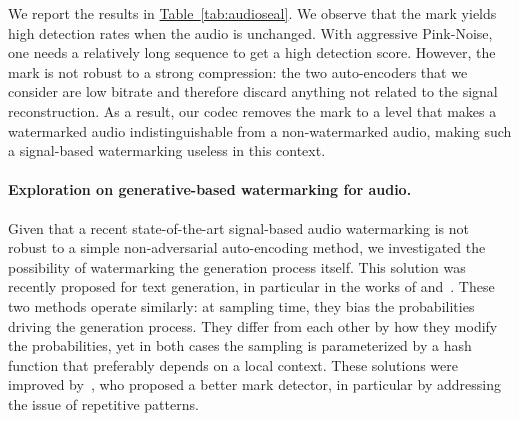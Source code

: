 We report the results in \hyperref[tab:audioseal]{Table~\ref{tab:audioseal}}. We observe that the mark yields high detection rates when the audio is unchanged. With aggressive Pink-Noise, one needs a relatively long sequence to get a high detection score. However, the mark is not robust to a strong compression: the two auto-encoders that we consider are low bitrate and therefore discard anything not related to the signal reconstruction. As a result, our \mimi{} codec removes the mark to a level that makes a watermarked audio indistinguishable from a non-watermarked audio, making such a signal-based watermarking useless in this context. 

\begin{table}[t]
\caption{\textbf{Evaluation of Audioseal}  \citep{san2024proactive} for watermarking the speech produced by Moshi. Each detection score is averaged over 1000 generations. %
\label{tab:audioseal}
}
\centering 
{%
}
\end{table}




\paragraph{Exploration on generative-based watermarking for audio.}

Given that a recent state-of-the-art signal-based audio watermarking is not robust to a simple non-adversarial auto-encoding method, we investigated the possibility of watermarking the generation process itself. This solution was recently proposed for text generation, in particular in the works of \cite{aaronson2023watermarking} and~\cite{kirchenbauer2023watermark}. These two methods operate similarly: at sampling time, they bias the probabilities driving the generation process. They differ from each other by how they modify the probabilities, yet in both cases the sampling is parameterized by a hash function that preferably depends on a local context. 
These solutions were improved by~\cite{fernandez2023three}, who proposed a better mark detector, in particular by addressing the issue of repetitive patterns. 

